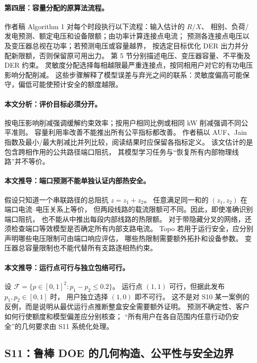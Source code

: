 \paragraph{第四层：容量分配的原算法流程。}
作者稿 Algorithm 1 对每个时段执行以下流程：输入估计的 $R/X$、
相别、负荷/发电预测、额定电压和设备限额；由功率计算连接点电流；
预测各连接点电压以及变压器总视在功率；若预测电压或容量越界，
按选定目标优化 DER 出力并分配新限额，否则保留原可用出力。
第 5 节分别描述电压、变压器容量、不平衡及 DER 约束。
灵敏度分配选择每相越限最严重连接点，按同相用户对它的有功电压影响分配削减。
这些步骤解释了模型误差与弃光之间的联系：灵敏度偏高可能保守，偏低可能使预计安全的额度越限。

\paragraph{本文分析：评价目标必须分开。}
按电压影响削减强调缓解约束效率；按用户相同比例或相同 kW 削减强调不同公平准则。
容量利用率改善不能推出所有公平指标都改善。
作者稿以 AUF、Jain 指数及最小/最大削减比并列比较，阅读结果时应保留各指标定义。
该文估计的是包含跨相作用的公共路径端口阻抗，
其模型学习任务与“恢复所有内部物理线路”并不等价。

\paragraph{本文推导：端口预测不能单独认证内部热安全。}
假设只知道一个串联路径的总阻抗 $z=z_1+z_2$。
任意满足同一和的 $(z_1,z_2)$ 在端口电流--电压关系上等价，
但两段线路的载流限额可不同。因此，即使准确识别端口阻抗，
也不能从中推出每段内部线路的热限额。
对于带隐藏分叉的网络，还须检查端口等效模型是否确定所有内部支路电流。
Topo 若用于运行安全，应分别声明哪些电压限制可由端口响应评估，
哪些热限制需要额外拓扑和设备参数。
变压器总容量限制也不能代替所有支路逐相热约束。

\paragraph{本文推导：运行点可行与独立包络可行。}
设 $\mathcal F=\{p\in[0,1]^2:p_1-p_2\leq0.2\}$。
运行点 $(1,1)$ 可行，但据此发布 $p_1,p_2\in[0,1]$ 时，
用户独立选择 $(1,0)$ 即不可行。
这不是对 S10 某一案例的反例，而是说明从最优运行点推断整盒安全需要额外证明。
预测不确定性、客户如何行使额度和模型偏差应分别核查；
“所有用户在各自范围内任意行动仍安全”的几何要求由 S11 系统化处理。

\subsection{S11：鲁棒 DOE 的几何构造、公平性与安全边界}
\label{subsec:S11}

